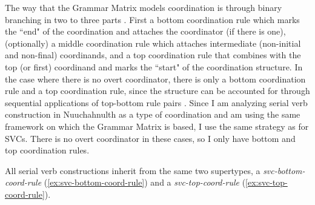 The way that the Grammar Matrix models coordination is through binary branching in two to three parts \citep{drellishakbender2005}. First a bottom coordination rule which marks the ``end" of the coordination and attaches the coordinator (if there is one), (optionally) a middle coordination rule which attaches intermediate (non-initial and non-final) coordinands, and a top coordination rule that combines with the top (or first) coordinand and marks the ``start" of the coordination structure. In the case where there is no overt coordinator, there is only a bottom coordination rule and a top coordination rule, since the structure can be accounted for through sequential applications of top-bottom rule pairs \citep[9]{drellishakbender2005}. Since I am analyzing serial verb construction in Nuuchahnulth as a type of coordination and am using the same framework on which the Grammar Matrix is based, I use the same strategy as \citeauthor{drellishakbender2005} for SVCs. There is no overt coordinator in these cases, so I only have bottom and top coordination rules.

All serial verb constructions inherit from the same two supertypes, a {\textit{svc-bottom-coord-rule}} (\ref{ex:svc-bottom-coord-rule}) and a {\textit{svc-top-coord-rule}} (\ref{ex:svc-top-coord-rule}).

\begin{singlespacing}
\ex \label{ex:svc-bottom-coord-rule}
\xe
\end{singlespacing}

